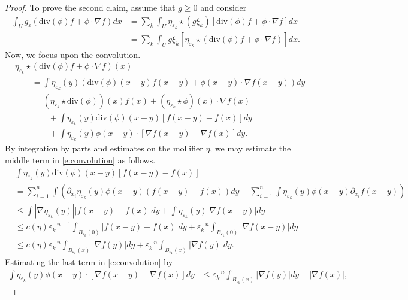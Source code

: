 \documentclass[12pt]{amsart}
\numberwithin{equation}{section}
\theoremstyle{plain}
\theoremstyle{definition}
\begin{document}
\begin{proof}
To prove the second claim, assume that $g \ge 0$ and consider 
\begin{align}\label{e: variation of smoothed g} \nonumber
    \int_{U} g_{\varepsilon}(\text{div}(\phi)f + \phi \cdot \nabla f)dx & = \sum_{k}\int_U \eta_{\varepsilon_k}\star (g\xi_k)[\text{div}(\phi)f + \phi \cdot \nabla f]dx\\
    & = \sum_{k}\int_U g\xi_k[\eta_{\varepsilon_k}\star (\text{div}(\phi)f + \phi \cdot \nabla f)]dx.
\end{align}
Now, we focus upon the convolution.  
\begin{align}\label{e:convolution} \nonumber
& \eta_{\varepsilon_k}\star (\text{div}(\phi)f + \phi \cdot \nabla f)(x)\\ \nonumber
& \qquad = \int \eta_{\varepsilon_k}(y)(\text{div}(\phi)(x-y)f(x-y) + \phi(x-y) \cdot \nabla f(x-y))dy\\ 
& \qquad = (\eta_{\varepsilon_k}\star \text{div}(\phi))(x)f(x) + (\eta_{\varepsilon_k}\star \phi)(x) \cdot\nabla f(x)\\ \nonumber
& \qquad \qquad  + \int \eta_{\varepsilon_k}(y)\text{div}(\phi)(x-y)[f(x-y) -f(x)]dy\\ \nonumber
& \qquad \qquad + \int\eta_{\varepsilon_k}(y)\phi(x-y) \cdot [\nabla f(x-y)-\nabla f(x)]dy.
\end{align}
By integration by parts and estimates on the mollifier $\eta$, we may estimate the middle term in \eqref{e:convolution} as follows.
\begin{align*}
&\int \eta_{\varepsilon_k}(y)\text{div}(\phi)(x-y)[f(x-y) -f(x)]\\
& = \sum_{i=1}^n\int (\partial_{x_i}\eta_{\varepsilon_k}(y)\phi(x-y)(f(x-y)-f(x))dy - \sum_{i=1}^n\int \eta_{\varepsilon_k}(y)\phi(x-y)\partial_{x_i}f(x-y))\\
& \le \int |\nabla \eta_{\varepsilon_k}(y)||f(x-y) -f(x)|dy + \int \eta_{\varepsilon_k}(y)|\nabla f(x-y)|dy\\
& \le c(\eta)\varepsilon_k^{-n-1}\int_{B_{\varepsilon_{k}}(0)} |f(x-y) -f(x)|dy + \varepsilon_k^{-n}\int_{B_{\varepsilon_{k}}(0)} |\nabla f(x-y)|dy\\
& \le c(\eta)\varepsilon_k^{-n}\int_{B_{\varepsilon_{k}}(x)} |\nabla f(y)|dy + \varepsilon_k^{-n}\int_{B_{\varepsilon_{k}}(x)} |\nabla f(y)|dy.
\end{align*}
Estimating the last term in \eqref{e:convolution} by 
\begin{align*}
    \int \eta_{\varepsilon_k}(y)\phi(x-y) \cdot [\nabla f(x-y)-\nabla f(x)]dy & \le \varepsilon_k^{-n}\int_{B_{\varepsilon_k}(x)} |\nabla f(y)|dy + |\nabla f(x)|,

\end{align*}
\end{proof}
\end{document}
